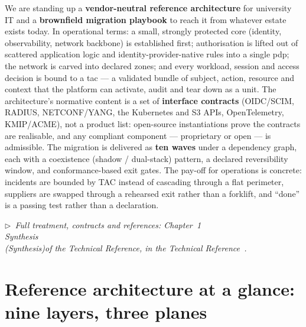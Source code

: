 \documentclass[11pt,a4paper]{article}
\newcommand{\keyword}[1]{\textbf{#1}}
\newcommand{\trchap}[2]{%
  Chapter~#1%
  \ifx\\#2\\\else\space(\emph{#2})\fi\space of the Technical Reference}
\newcommand{\mainref}[1]{%
  \par\vspace{1pt}
  {\footnotesize\color{gray}\itshape
  $\triangleright$~Full treatment, contracts and references: #1,
  in the Technical Reference~\cite{ng-tech-ref-2026}.}\par\vspace{2pt}}
\begin{document}
\noindent We are standing up a \keyword{vendor-neutral reference
architecture} for university IT and a \keyword{brownfield migration
playbook} to reach it from whatever estate exists today. In operational
terms: a small, strongly protected core (identity, observability, network
backbone) is established first; authorisation is lifted out of scattered
application logic and identity-provider-native rules into a single
\gls{pdp}; the network is carved into declared zones; and every workload,
session and access decision is bound to a \gls{tac} --- a validated bundle of
subject, action, resource and context that the platform can activate,
audit and tear down as a unit. The architecture's normative content is a
set of \keyword{interface contracts} (OIDC/SCIM, RADIUS, NETCONF/YANG, the
Kubernetes and S3 APIs, OpenTelemetry, KMIP/ACME), not a product list:
open-source instantiations prove the contracts are realisable, and any
compliant component --- proprietary or open --- is admissible.
The migration is delivered as \keyword{ten waves} under a dependency graph,
each with a coexistence (shadow / dual-stack) pattern, a declared
reversibility window, and conformance-based exit gates. The pay-off for
operations is concrete: incidents are bounded by TAC instead of cascading
through a flat perimeter, suppliers are swapped through a rehearsed exit
rather than a forklift, and ``done'' is a passing test rather than a
declaration.

\mainref{\trchap{1}{Synthesis}}

\section{Reference architecture at a glance: nine layers, three planes}
\end{document}
